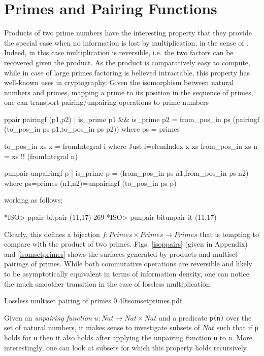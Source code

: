 \documentclass[]{INCLUDES/llncs}
\begin{document}
\section{Primes and Pairing Functions} \label{pp}
Products of two prime numbers have the interesting property that they provide
the special case when no information is lost by multiplication, in the sense of
\cite{DBLP:journals/tit/Pippenger05}. Indeed, in this case multiplication is
reversible, i.e. the two factors can be recovered given the product. 
As the product is comparatively easy to compute, while in case of large primes
factoring is believed intractable, this property has well-known uses in
cryptography.
Given the isomorphism between natural numbers and primes, mapping a prime to its
position in the sequence of primes, one can transport pairing/unpairing
operations to prime numbers
\begin{code}
ppair pairingf (p1,p2) | is_prime p1 && is_prime p2 = 
  from_pos_in ps (pairingf (to_pos_in ps p1,to_pos_in ps p2)) where 
    ps = primes

to_pos_in xs x = fromIntegral i where Just i=elemIndex x xs
from_pos_in xs n = xs !! (fromIntegral n)
  
punpair unpairingf p | is_prime p = (from_pos_in ps n1,from_pos_in ps n2) where 
  ps=primes
  (n1,n2)=unpairingf (to_pos_in ps p)
\end{code}
working as follows:
\begin{codex}
*ISO> ppair bitpair (11,17)
269
*ISO> punpair bitunpair it
(11,17)
\end{codex}
Clearly, this defines a bijection $f : Primes \times Primes \rightarrow Primes$
that is tempting to compare with the product of two primes. 
Figs. \ref{isoppairs} (given in Appendix) and \ref{isomsetprimes} shows the
surfaces generated by products and multiset pairings of primes. While both commutative
operations are reversible and likely to be asymptotically equivalent in
terms of information density, one can notice the much smoother transition in the case
of lossless multiplication.

{Lossless multiset pairing of primes}
{0.40}{isomsetprimes.pdf}

Given an {\em unpairing function} {$u:Nat \rightarrow Nat \times Nat$} and a
predicate {\tt p(n)} over the set of natural numbers, it makes sense to
investigate subsets of $Nat$ such that if {\tt p} holds for {\tt n} then it also
holds after applying the unpairing function {\tt u} to {\tt n}. More
interestingly, one can look at subsets for which this property holds recursively.
\end{document}
